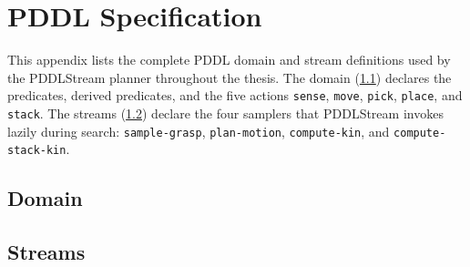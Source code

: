 
\chapter{PDDL Specification}
\label{ch:appendix-pddl}

This appendix lists the complete PDDL domain and stream definitions used by
the PDDLStream planner throughout the thesis. The domain
(\cref{sec:appendix-domain}) declares the predicates, derived predicates,
and the five actions \texttt{sense}, \texttt{move}, \texttt{pick},
\texttt{place}, and \texttt{stack}. The streams (\cref{sec:appendix-streams})
declare the four samplers that PDDLStream invokes lazily during search:
\texttt{sample-grasp}, \texttt{plan-motion}, \texttt{compute-kin}, and
\texttt{compute-stack-kin}.

\section{Domain}
\label{sec:appendix-domain}



\section{Streams}
\label{sec:appendix-streams}


